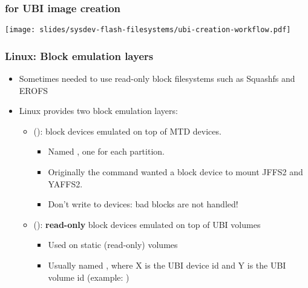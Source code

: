 \begin{frame}
  \frametitle{ for UBI image creation}
  \begin{center}
    \texttt{[image: slides/sysdev-flash-filesystems/ubi-creation-workflow.pdf]}
  \end{center}
\end{frame}

\begin{frame}
  \frametitle{Linux: Block emulation layers}
  \begin{itemize}
  \item Sometimes needed to use read-only block filesystems such as Squashfs and EROFS
  \item Linux provides two block emulation layers:
    \begin{itemize}
    \item {} ():
       block devices emulated on top of MTD devices.
       \begin{itemize}
       \item Named , one for each partition.
       \item Originally the  command wanted a block device to mount JFFS2 and YAFFS2.
       \item Don't write to  devices: bad blocks are not handled!
       \end{itemize}
    \item {} ():
       {\bf read-only} block devices emulated on top of UBI volumes
       \begin{itemize}
       \item Used on static (read-only) volumes
       \item Usually named , where X is the UBI device
             id and Y is the UBI volume id (example: )
       \end{itemize}
    \end{itemize}
  \end{itemize}
\end{frame}
